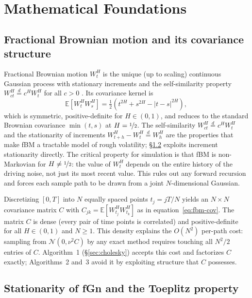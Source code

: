 \section{Mathematical Foundations}
\label{sec:foundations}

\subsection{Fractional Brownian motion and its covariance structure}

Fractional Brownian motion $W_t^H$ is the unique (up to scaling) continuous Gaussian
process with stationary increments and the self-similarity property
$W_{ct}^H \stackrel{d}{=} c^H W_t^H$ for all $c > 0$
\citep{mandelbrot1968fractional}.  Its covariance kernel is
\begin{equation}
  \label{eq:fbm-cov}
  \mathbb{E}[W_t^H W_s^H]
  = \tfrac{1}{2}\!\left(t^{2H} + s^{2H} - |t-s|^{2H}\right),
\end{equation}
which is symmetric, positive-definite for $H \in (0,1)$, and reduces to the standard
Brownian covariance $\min(t,s)$ at $H = \nicefrac{1}{2}$.  The self-similarity
$W_{ct}^H \stackrel{d}{=} c^H W_t^H$ and the stationarity of increments
$W_{t+h}^H - W_t^H \stackrel{d}{=} W_h^H$ are the properties that make fBM a
tractable model of rough volatility; §\ref{sec:toeplitz} exploits increment
stationarity directly.  The critical property for simulation is that fBM is
non-Markovian for $H \neq \nicefrac{1}{2}$: the value of $W_t^H$ depends on
the entire history of the driving noise, not just its most recent value.  This rules
out any forward recursion and forces each sample path to be drawn from a joint
$N$-dimensional Gaussian.

Discretizing $[0,T]$ into $N$ equally spaced points $t_j = jT/N$ yields an $N\times N$
covariance matrix $C$ with $C_{jk} = \mathbb{E}[W_{t_j}^H W_{t_k}^H]$ as in
equation~\eqref{eq:fbm-cov}.  The matrix $C$ is dense (every pair of time points is correlated) and positive-definite
for all $H \in (0,1)$ and $N \geq 1$.  This density explains the $O(N^2)$ per-path
cost: sampling from
$\mathcal{N}(0,\nu^2 C)$ by any exact method requires touching all $N^2/2$ entries
of $C$.  Algorithm~1 (§\ref{sec:cholesky}) accepts this cost and factorizes $C$
exactly; Algorithms~2 and~3 avoid it by exploiting structure that $C$ possesses.

\subsection{Stationarity of fGn and the Toeplitz property}
\label{sec:toeplitz}

